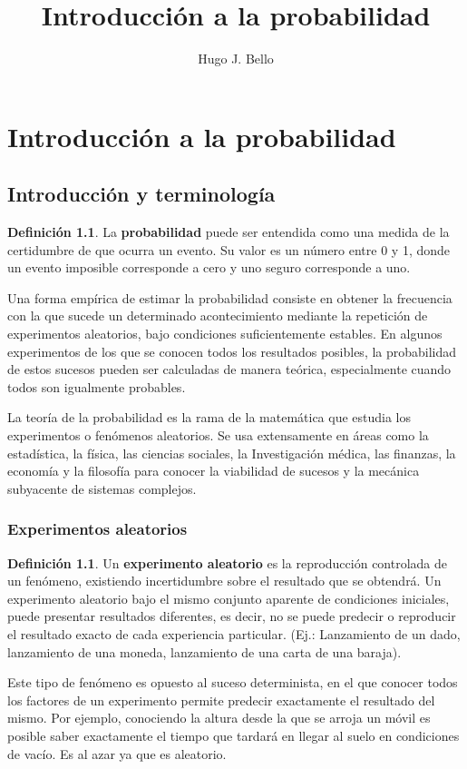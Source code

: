 \documentclass[]{book}
\title{Introducción a la probabilidad}
\author{Hugo J. Bello}
\date{}
\theoremstyle{plain}
\theoremstyle{definition}
\newtheorem{definition}[theorem]{Definición}
\begin{document}
\chapter{Introducción a la probabilidad}

\section{Introducción y terminología}

\begin{definition}
La \textbf{probabilidad} puede ser entendida como una medida de la certidumbre de que ocurra un evento. 
Su valor es un número entre 0 y 1, 
donde un evento imposible corresponde a cero y uno seguro corresponde a uno.
\end{definition}

Una forma empírica de estimar la probabilidad consiste en obtener la 
frecuencia con la que sucede un determinado acontecimiento mediante la 
repetición de experimentos aleatorios, bajo condiciones suficientemente estables. 
En algunos experimentos de los que se conocen todos los resultados posibles, 
la probabilidad de estos sucesos pueden ser calculadas de manera teórica, 
especialmente cuando todos son igualmente probables.

La teoría de la probabilidad es la rama de la matemática que estudia los experimentos 
o fenómenos aleatorios. Se usa extensamente en áreas como la estadística, 
la física, las ciencias sociales, la Investigación médica, las finanzas, 
la economía y la filosofía para conocer la viabilidad de sucesos 
y la mecánica subyacente de sistemas complejos. 

\subsection*{Experimentos aleatorios}

\begin{definition}
Un \textbf{experimento aleatorio} es la reproducción controlada de un fenómeno, 
existiendo incertidumbre sobre el resultado que se obtendrá.
Un experimento aleatorio bajo el mismo conjunto aparente de condiciones iniciales, 
puede presentar resultados diferentes, es decir, no se puede predecir o reproducir 
el resultado exacto de cada experiencia particular. (Ej.: Lanzamiento de un dado,
lanzamiento de una moneda, lanzamiento de una carta de una baraja).

Este tipo de fenómeno es opuesto al suceso determinista, 
en el que conocer todos los factores de un experimento permite 
predecir exactamente el resultado del mismo. Por ejemplo, conociendo 
la altura desde la que se arroja un móvil es posible saber exactamente
el tiempo que tardará en llegar al suelo en condiciones de vacío. 
 Es al azar ya que es aleatorio. 
\end{definition}
\end{document}

